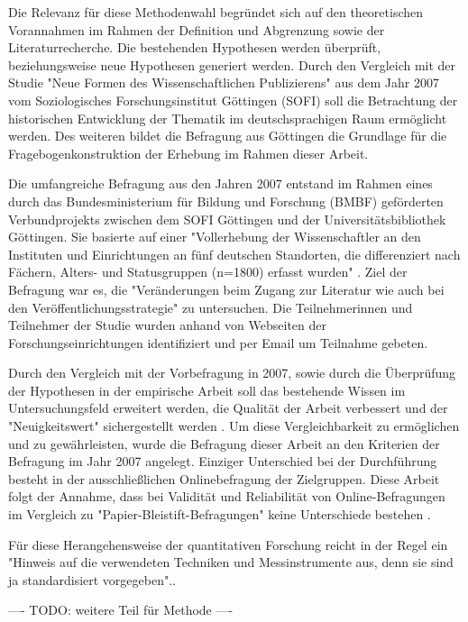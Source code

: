 Die Relevanz für diese Methodenwahl begründet sich auf den theoretischen Vorannahmen im Rahmen der Definition und Abgrenzung sowie der Literaturrecherche. Die bestehenden Hypothesen werden überprüft, beziehungsweise neue Hypothesen generiert werden. Durch den Vergleich mit der Studie "Neue Formen des Wissenschaftlichen Publizierens" aus dem Jahr 2007 vom Soziologisches Forschungsinstitut Göttingen (SOFI) soll die Betrachtung der historischen Entwicklung der Thematik im deutschsprachigen Raum ermöglicht werden. Des weiteren bildet die Befragung aus Göttingen die Grundlage für die Fragebogenkonstruktion der Erhebung im Rahmen dieser Arbeit.

Die umfangreiche Befragung aus den Jahren 2007 entstand im Rahmen eines durch das Bundesministerium für Bildung und Forschung (BMBF) geförderten Verbundprojekts zwischen dem SOFI Göttingen und der Universitätsbibliothek Göttingen. Sie basierte auf einer "Vollerhebung der Wissenschaftler an den Instituten und Einrichtungen an fünf deutschen Standorten, die differenziert nach Fächern, Alters- und Statusgruppen (n=1800) erfasst wurden" \cite{Hanekop_2014}. Ziel der Befragung war es, die "Veränderungen beim Zugang zur Literatur wie auch bei den Veröffentlichungsstrategie" \cite{Hanekop_Wittke_2007_Fragebogen} zu untersuchen. Die Teilnehmerinnen und Teilnehmer der Studie wurden anhand von Webseiten der Forschungseinrichtungen identifiziert und per Email um Teilnahme gebeten.

Durch den Vergleich mit der Vorbefragung in 2007, sowie durch die Überprüfung der Hypothesen in der empirische Arbeit soll das bestehende Wissen im Untersuchungsfeld erweitert werden, die Qualität der Arbeit verbessert und der "Neuigkeitswert" sichergestellt werden \cite{raab_2012_fragebogen}. Um diese Vergleichbarkeit zu ermöglichen und zu gewährleisten, wurde die Befragung dieser Arbeit an den Kriterien der Befragung im Jahr 2007 angelegt. Einziger Unterschied bei der Durchführung besteht in der ausschließlichen Onlinebefragung der Zielgruppen. Diese Arbeit folgt der Annahme, dass bei Validität und Reliabilität von Online-Befragungen im Vergleich zu "Papier-Bleistift-Befragungen" keine Unterschiede bestehen \cite{Batinic_2013_onlinebefrag}.

Für diese Herangehensweise der quantitativen Forschung reicht in der Regel ein "Hinweis auf die verwendeten Techniken und Messinstrumente aus, denn sie sind ja standardisiert vorgegeben".\cite{Mayring_1999:119}.

---- TODO: weitere Teil für Methode ----


